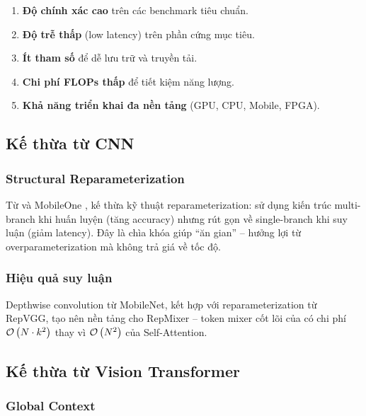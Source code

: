 \begin{enumerate}
    \item \textbf{Độ chính xác cao} trên các benchmark tiêu chuẩn.
    \item \textbf{Độ trễ thấp} (low latency) trên phần cứng mục tiêu.
    \item \textbf{Ít tham số} để dễ lưu trữ và truyền tải.
    \item \textbf{Chi phí FLOPs thấp} để tiết kiệm năng lượng.
    \item \textbf{Khả năng triển khai đa nền tảng} (GPU, CPU, Mobile, FPGA).
\end{enumerate}

\subsection{Kế thừa từ CNN}

\subsubsection*{Structural Reparameterization}

Từ \repvgg{} và MobileOne \cite{mobileone2023}, \fastvit{} kế thừa kỹ thuật reparameterization: sử dụng kiến trúc multi-branch khi huấn luyện (tăng accuracy) nhưng rút gọn về single-branch khi suy luận (giảm latency). Đây là chìa khóa giúp \fastvit{} ``ăn gian'' -- hưởng lợi từ overparameterization mà không trả giá về tốc độ.

\subsubsection*{Hiệu quả suy luận}

Depthwise convolution từ MobileNet, kết hợp với reparameterization từ RepVGG, tạo nên nền tảng cho RepMixer -- token mixer cốt lõi của \fastvit{} có chi phí $\mathcal{O}\left(N \cdot k^2\right)$ thay vì $\mathcal{O}\left(N^2\right)$ của Self-Attention.

\subsection{Kế thừa từ Vision Transformer}

\subsubsection*{Global Context}

